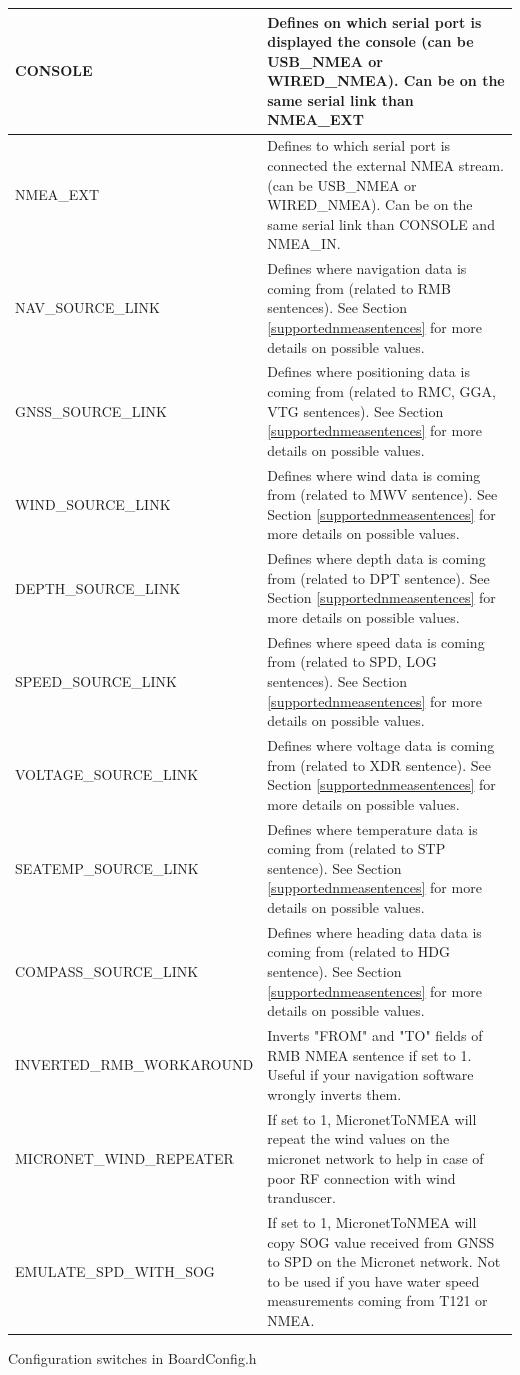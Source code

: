\documentclass{report}
\begin{document}
\begin{tabularx}{\linewidth}{@{}lX@{}}
		\hline
		CONSOLE & Defines on which serial port is displayed the console (can be USB\_NMEA or WIRED\_NMEA). Can be on the same serial link than NMEA\_EXT\\
		\hline
		NMEA\_EXT & Defines to which serial port is connected the external NMEA stream. (can be USB\_NMEA or WIRED\_NMEA). Can be on the same serial link than CONSOLE and NMEA\_IN.\\
		\hline
		NAV\_SOURCE\_LINK & Defines where navigation data is coming from (related to RMB sentences). See Section {\ref{supportednmeasentences}} for more details on possible values.\\
		\hline
		GNSS\_SOURCE\_LINK & Defines where positioning data is coming from (related to RMC, GGA, VTG sentences). See Section {\ref{supportednmeasentences}} for more details on possible values.\\
		\hline
		WIND\_SOURCE\_LINK & Defines where wind data is coming from (related to MWV sentence). See Section {\ref{supportednmeasentences}} for more details on possible values.\\
		\hline
		DEPTH\_SOURCE\_LINK & Defines where depth data is coming from (related to DPT sentence). See Section {\ref{supportednmeasentences}} for more details on possible values.\\
		\hline
		SPEED\_SOURCE\_LINK & Defines where speed data is coming from (related to SPD, LOG sentences). See Section {\ref{supportednmeasentences}} for more details on possible values.\\
		\hline
		VOLTAGE\_SOURCE\_LINK & Defines where voltage data is coming from (related to XDR sentence). See Section {\ref{supportednmeasentences}} for more details on possible values.\\
		\hline
		SEATEMP\_SOURCE\_LINK & Defines where temperature data is coming from (related to STP sentence). See Section {\ref{supportednmeasentences}} for more details on possible values.\\
		\hline
		COMPASS\_SOURCE\_LINK & Defines where heading data data is coming from (related to HDG sentence). See Section {\ref{supportednmeasentences}} for more details on possible values.\\
		\hline
		INVERTED\_RMB\_WORKAROUND & Inverts "FROM" and "TO" fields of RMB NMEA sentence if set to 1. Useful if your navigation software wrongly inverts them.\\
		\hline
		MICRONET\_WIND\_REPEATER & If set to 1, MicronetToNMEA will repeat the wind values on the micronet network to help in case of poor RF connection with wind tranduscer.\\
		\hline
		EMULATE\_SPD\_WITH\_SOG & If set to 1, MicronetToNMEA will copy SOG value received from GNSS to SPD on the Micronet network. Not to be used if you have water speed measurements coming from T121 or NMEA. \\
		\hline
\end{tabularx}
\begin{table}[h]
	\caption{Configuration switches in BoardConfig.h}
\label{table:configswitches}
\end{table}
\end{document}
